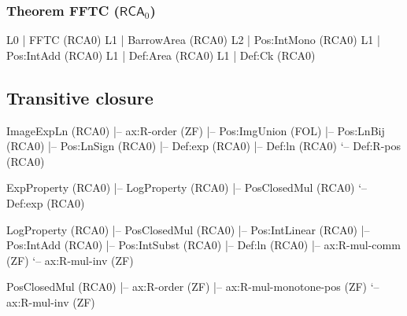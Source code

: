 \documentclass[11pt,reqno]{amsart}
\theoremstyle{redplain}
\begin{document}
\subsubsection*{Theorem \textsf{FFTC} ($\textsf{RCA}_0$)}
\begin{verbatimbox}
	L0 | FFTC                             (RCA0)
	L1 |   BarrowArea                     (RCA0)
	L2 |     Pos:IntMono                  (RCA0)
	L1 |   Pos:IntAdd                     (RCA0)
	L1 |   Def:Area                       (RCA0)
	L1 |   Def:Ck                         (RCA0)
\end{verbatimbox}

\subsection{Transitive closure}
\begin{verbatimbox}
	ImageExpLn                        (RCA0)
	|-- ax:R-order                    (ZF)
	|-- Pos:ImgUnion                  (FOL)
	|-- Pos:LnBij                     (RCA0)
	|-- Pos:LnSign                    (RCA0)
	|-- Def:exp                       (RCA0)
	|-- Def:ln                        (RCA0)
	`-- Def:R-pos                     (RCA0)

	ExpProperty                       (RCA0)
	|-- LogProperty                   (RCA0)
	|-- PosClosedMul                  (RCA0)
	`-- Def:exp                       (RCA0)

	LogProperty                       (RCA0)
	|-- PosClosedMul                  (RCA0)
	|-- Pos:IntLinear                 (RCA0)
	|-- Pos:IntAdd                    (RCA0)
	|-- Pos:IntSubst                  (RCA0)
	|-- Def:ln                        (RCA0)
	|-- ax:R-mul-comm                 (ZF)
	`-- ax:R-mul-inv                  (ZF)

	PosClosedMul                      (RCA0)
	|-- ax:R-order                    (ZF)
	|-- ax:R-mul-monotone-pos         (ZF)
	`-- ax:R-mul-inv                  (ZF)
\end{verbatimbox}
\end{document}
